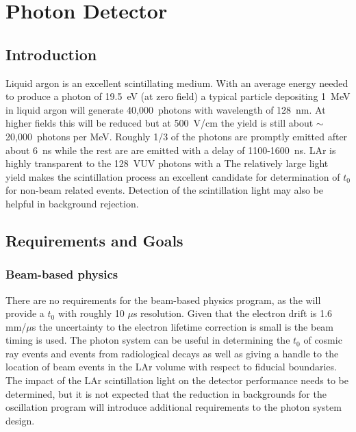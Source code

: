 \chapter{Photon Detector}
\label{ch:photon}
\section{Introduction}



Liquid argon is an excellent scintillating medium. With an average
energy needed to produce a photon of 19.5~eV (at zero field) a typical
particle depositing 1~MeV in liquid argon will generate 40,000~photons
with wavelength of 128~nm. At higher fields this will be reduced but
at 500~V/cm the yield is still about $\sim$20,000~photons per
MeV. Roughly 1/3 of the photons are promptly emitted after about 6~ns
while the rest are are emitted with a delay of 1100-1600~ns. LAr
is highly transparent to the 128~VUV photons with a  The relatively large light yield makes the scintillation
process an excellent candidate for determination of $t_{0}$ for
non-beam related events. Detection of the scintillation light may also
be helpful in background rejection.

\section{Requirements and Goals}

\subsection{Beam-based physics}

There are no requirements for the beam-based physics program, as the
 will provide a $t_{0}$ with roughly 10 $\mu$s
resolution. Given that the electron drift is 1.6 mm/$\mu$s the
uncertainty to the electron lifetime correction is small is  the beam
timing is used. The photon system can be useful in determining the
$t_{0}$ of cosmic ray events and events from radiological decays as
well as giving a handle to the location of beam events in the LAr
volume with respect to fiducial boundaries. The impact of the LAr
scintillation light on the detector performance needs to be
determined, but it is not expected that the reduction in backgrounds
for the oscillation program will introduce additional requirements to
the photon system design.

